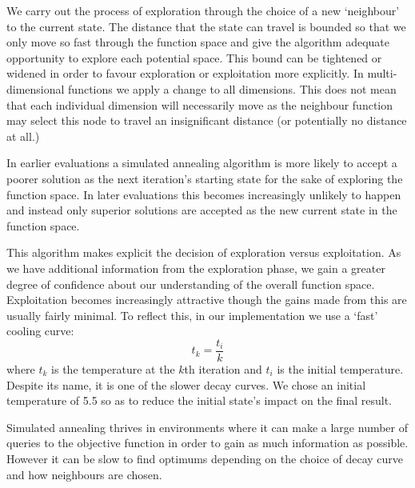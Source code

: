 		We carry out the process of exploration through the choice of a new `neighbour' to the current state. The distance that the state can travel is bounded so that we only move so fast through the function space and give the algorithm adequate opportunity to explore each potential space. This bound can be tightened or widened in order to favour exploration or exploitation more explicitly. In multi-dimensional functions we apply a change to all dimensions. This does not mean that each individual dimension will necessarily move as the neighbour function may select this node to travel an insignificant distance (or potentially no distance at all.)
		
		In earlier evaluations a simulated annealing algorithm is more likely to accept a poorer solution as the next iteration's starting state for the sake of exploring the function space. In later evaluations this becomes increasingly unlikely to happen and instead only superior solutions are accepted as the new current state in the function space.
		
		This algorithm makes explicit the decision of exploration versus exploitation. As we have additional information from the exploration phase, we gain a greater degree of confidence about our understanding of the overall function space. Exploitation becomes increasingly attractive though the gains made from this are usually fairly minimal. To reflect this, in our implementation we use a `fast' cooling curve:
		\begin{equation}
			 t_k = \frac{t_i}{k}
		\end{equation}
		where $t_k$ is the temperature at the $k$th iteration and $t_i$ is the initial temperature. Despite its name, it is one of the slower decay curves. We chose an initial temperature of 5.5\cite{wright2010automating} so as to reduce the initial state's impact on the final result.

		Simulated annealing thrives in environments where it can make a large number of queries to the objective function in order to gain as much information as possible. However it can be slow to find optimums depending on the choice of decay curve and how neighbours are chosen. 
		
